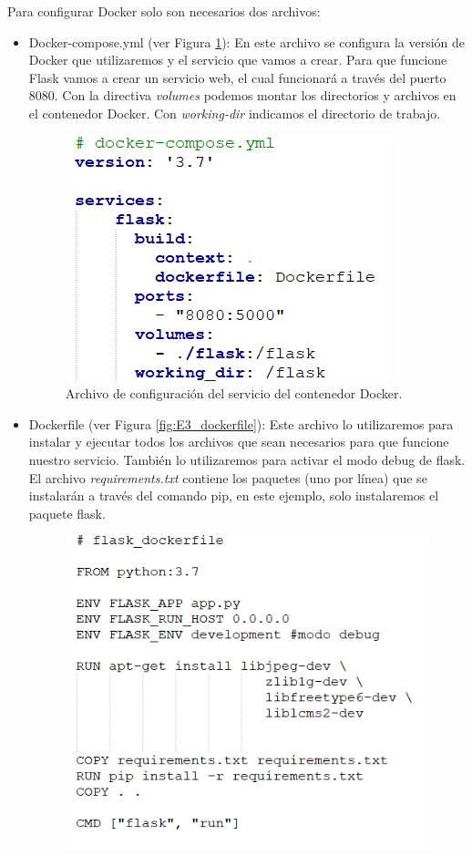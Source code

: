 \documentclass[11pt,a4paper]{article}
\begin{document}
Para configurar Docker solo son necesarios dos archivos:
\begin{itemize}
    \item Docker-compose.yml (ver Figura \ref{fig:E3_docker}): En este archivo se configura la versión de Docker que utilizaremos y el servicio que vamos a crear. Para que funcione Flask vamos a crear un servicio web, el cual funcionará a través del puerto 8080. Con la directiva \emph{volumes} podemos montar los directorios y archivos en el contenedor Docker. Con \emph{working-dir} indicamos el directorio de trabajo. 
    \begin{figure}[H]
    	\centering
    	\includegraphics[scale=0.5]{images/E3_docker-compose.PNG}
    	\caption[Docker-compose.yml]{Archivo de configuración del servicio del contenedor Docker.}
    	\label{fig:E3_docker}
    \end{figure}
    \item Dockerfile (ver Figura \ref{fig:E3_dockerfile}): Este archivo lo utilizaremos para instalar y ejecutar todos los archivos que sean necesarios para que funcione nuestro servicio. También lo utilizaremos para activar el modo debug de flask. El archivo \emph{requirements.txt} contiene los paquetes (uno por línea) que se instalarán a través del comando pip, en este ejemplo, solo instalaremos el paquete flask.
    \begin{figure}[H]
    	\centering
    	\includegraphics[scale=0.5]{images/E3_dockerfile.PNG}

\end{figure}
\end{itemize}
\end{document}
